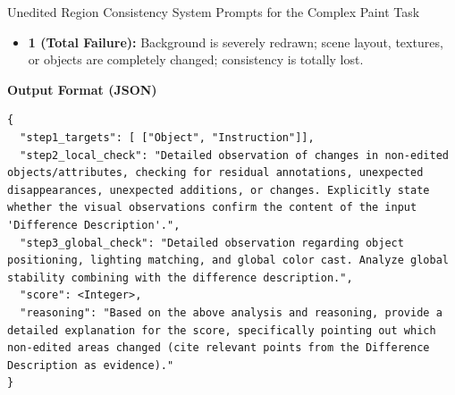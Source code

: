 \begin{promptbox}[label={System Prompts: URC_Complex_paint}]{Unedited Region Consistency System Prompts for the Complex Paint Task}
\begin{itemize}[leftmargin=2.2em, labelsep=0.5em, itemsep=2pt]
    \item \textbf{1 (Total Failure):} Background is severely redrawn; scene layout, textures, or objects are completely changed; consistency is totally lost.
\end{itemize}

\medskip

\textbf{Output Format (JSON)}

\begin{lstlisting}
{
  "step1_targets": [ ["Object", "Instruction"]],
  "step2_local_check": "Detailed observation of changes in non-edited objects/attributes, checking for residual annotations, unexpected disappearances, unexpected additions, or changes. Explicitly state whether the visual observations confirm the content of the input 'Difference Description'.",
  "step3_global_check": "Detailed observation regarding object positioning, lighting matching, and global color cast. Analyze global stability combining with the difference description.",
  "score": <Integer>,
  "reasoning": "Based on the above analysis and reasoning, provide a detailed explanation for the score, specifically pointing out which non-edited areas changed (cite relevant points from the Difference Description as evidence)."
}
\end{lstlisting}

\end{promptbox}


\clearpage

